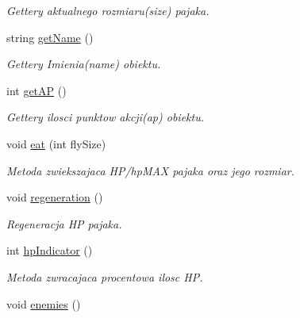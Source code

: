 \begin{DoxyCompactItemize}
\begin{DoxyCompactList}\small\item\em Gettery aktualnego rozmiaru(size) pajaka. \end{DoxyCompactList}\item 
string \hyperlink{class_spider_a472846b010cff9f25626e7cb08dd6b8e}{get\+Name} ()\hypertarget{class_spider_a472846b010cff9f25626e7cb08dd6b8e}{}\label{class_spider_a472846b010cff9f25626e7cb08dd6b8e}

\begin{DoxyCompactList}\small\item\em Gettery Imienia(name) obiektu. \end{DoxyCompactList}\item 
int \hyperlink{class_spider_a17b94ee77b7eccefa1a5e81725ed5ae6}{get\+AP} ()\hypertarget{class_spider_a17b94ee77b7eccefa1a5e81725ed5ae6}{}\label{class_spider_a17b94ee77b7eccefa1a5e81725ed5ae6}

\begin{DoxyCompactList}\small\item\em Gettery ilosci punktow akcji(ap) obiektu. \end{DoxyCompactList}\item 
void \hyperlink{class_spider_ae15b05f08d3557a259cd742885ea26ce}{eat} (int fly\+Size)
\begin{DoxyCompactList}\small\item\em Metoda zwiekszajaca H\+P/hp\+M\+AX pajaka oraz jego rozmiar. \end{DoxyCompactList}\item 
void \hyperlink{class_spider_ab72a2aaac5df07077dff3ecc7ca34326}{regeneration} ()\hypertarget{class_spider_ab72a2aaac5df07077dff3ecc7ca34326}{}\label{class_spider_ab72a2aaac5df07077dff3ecc7ca34326}

\begin{DoxyCompactList}\small\item\em Regeneracja HP pajaka. \end{DoxyCompactList}\item 
int \hyperlink{class_spider_adbf0fe184a1eb643b694c15666bca832}{hp\+Indicator} ()\hypertarget{class_spider_adbf0fe184a1eb643b694c15666bca832}{}\label{class_spider_adbf0fe184a1eb643b694c15666bca832}

\begin{DoxyCompactList}\small\item\em Metoda zwracajaca procentowa ilosc HP. \end{DoxyCompactList}\item 
void \hyperlink{class_spider_ade36f95469cbaa376caa91b035c4016b}{enemies} ()\hypertarget{class_spider_ade36f95469cbaa376caa91b035c4016b}{}\label{class_spider_ade36f95469cbaa376caa91b035c4016b}


\end{DoxyCompactItemize}
